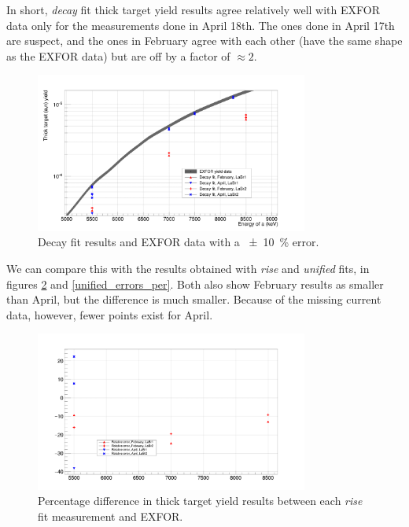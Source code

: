 \documentclass[a4paper,12pt]{report}
\begin{document}
In short, \textit{decay} fit thick target yield results agree relatively well with EXFOR data only for the measurements done in April 18th.
The ones done in April 17th are suspect, and the ones in February agree with each other (have the same shape as the EXFOR data) but are off by a factor of $\approx 2$.

\begin{figure}[H]
	\centering
	\includegraphics[width=0.80\textwidth]{reactions_v_energy_decay.png}
	\caption{Decay fit results and EXFOR data with a \qty{\pm 10}{\percent} error.}
	\label{reactions_v_energy_decay}
\end{figure}

We can compare this with the results obtained with \textit{rise} and \textit{unified} fits, in figures \ref{rise_errors_per} and \ref{unified_errors_per}.
Both also show February results as smaller than April, but the difference is much smaller.
Because of the missing current data, however, fewer points exist for April.

\begin{figure}[H]
	\centering
	\includegraphics[width=0.80\textwidth]{rise_errors_per.png}
	\caption{Percentage difference in thick target yield results between each \textit{rise} fit measurement and EXFOR.}
	\label{rise_errors_per}
\end{figure}
\end{document}
